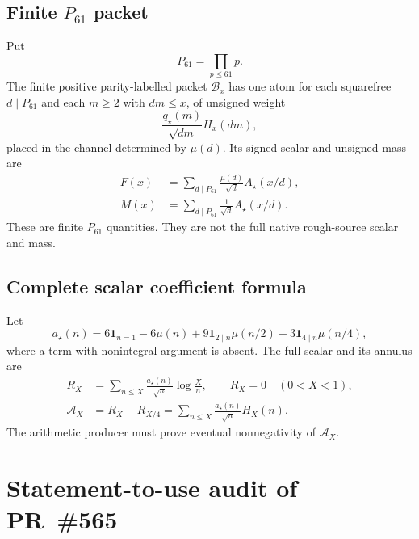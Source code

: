 \documentclass[11pt]{article}
\newcommand{\Psmall}{P_{61}}
\newcommand{\one}{\mathbf 1}
\newcommand{\Ann}{\mathcal A}
\newcommand{\Base}{\mathcal B}
\begin{document}
\subsection{Finite $P_{61}$ packet}
Put
\[
 \Psmall=\prod_{p\le61}p.
\]
The finite positive parity-labelled packet $\Base_x$ has one atom for each squarefree $d\mid\Psmall$ and each $m\ge2$ with $dm\le x$, of unsigned weight
\[
 \frac{q_\star(m)}{\sqrt{dm}}H_x(dm),
\]
placed in the channel determined by $\mu(d)$.  Its signed scalar and unsigned mass are
\begin{align}
 F(x)&=\sum_{d\mid\Psmall}\frac{\mu(d)}{\sqrt d}A_\star(x/d),\label{eq:F}\\
 M(x)&=\sum_{d\mid\Psmall}\frac1{\sqrt d}A_\star(x/d).\label{eq:M}
\end{align}
These are finite $P_{61}$ quantities.  They are not the full native rough-source scalar and mass.

\subsection{Complete scalar coefficient formula}
Let
\[
 a_\star(n)=6\one_{n=1}-6\mu(n)
 +9\one_{2\mid n}\mu(n/2)-3\one_{4\mid n}\mu(n/4),
\]
where a term with nonintegral argument is absent.  The full scalar and its annulus are
\begin{align}
 R_X&=\sum_{n\le X}\frac{a_\star(n)}{\sqrt n}\log\frac Xn,
 \qquad R_X=0\quad(0<X<1),\label{eq:RX}\\
 \Ann_X&=R_X-R_{X/4}
 =\sum_{n\le X}\frac{a_\star(n)}{\sqrt n}H_X(n).\label{eq:AX}
\end{align}
The arithmetic producer must prove eventual nonnegativity of $\Ann_X$.

\section{Statement-to-use audit of PR~\#565}
\end{document}
